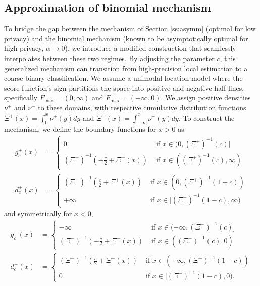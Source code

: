 \documentclass[a4paper, 11pt]{article}
\theoremstyle{definition}
\begin{document}
{\subsection{Approximation of binomial mechanism}{\label{ss:approx}}
To bridge the gap between the mechanism of Section \ref{ss:asymm} (optimal for low privacy) and the binomial mechanism (known to be asymptotically optimal for high privacy, $\alpha \to 0$), we introduce a modified construction that seamlessly interpolates between these two regimes. By adjusting the parameter $c$, this generalized mechanism can transition from high-precision local estimation to a coarse binary classification. We assume a unimodal location model where the score function's sign partitions the space into positive and negative half-lines, specifically $F^+_{\text{max}}=(0,\infty)$ and $F^{\prime +}_{\text{max}}=(-\infty,0)$. We assign positive densities $\nu^+$ and $\nu^-$ to these domains, with respective cumulative distribution functions $\Xi^+(x)=\int_0^x \nu^+(y)dy$ and $\Xi^-(x)=\int_{-\infty}^x \nu^-(y)dy$. To construct the mechanism, we define the boundary functions for $x>0$ as
\begin{align*}
	g^+_c(x)&=
	\begin{cases}
		0 & \text{ if $x \in (0, (\Xi^+)^{-1}(c) ]$}
			\\
		(\Xi^+)^{-1}(-\frac{c}{2}+\Xi^+(x)) & \text{ if $x \in ( (\Xi^+)^{-1}(c), \infty)$}
	\end{cases}
	\\
	d^+_c(x)&=
	\begin{cases}
		(\Xi^+)^{-1}(\frac{c}{2}+\Xi^+(x)) & \text{ if $x \in (0 , (\Xi^+)^{-1}(1-c))$}
		\\
		+\infty & \text{ if $x \in [ (\Xi^+)^{-1}(1-c), \infty)$}
	\end{cases}
\end{align*}
and symmetrically for $x<0$,
\begin{align*}
	g^-_c(x)&=
	\begin{cases}
		-\infty  & \text{ if $x \in (-\infty, (\Xi^-)^{-1}(c) ]$}
		\\
		(\Xi^-)^{-1}(-\frac{c}{2}+\Xi^-(x)) & \text{ if $x \in ( (\Xi^-)^{-1}(c),0)$}
	\end{cases}
	\\
	d^-_c(x)&=
	\begin{cases}
		(\Xi^-)^{-1}(\frac{c}{2}+\Xi^-(x)) & \text{ if $x \in (-\infty , (\Xi^-)^{-1}(1-c))$}
		\\
		0 & \text{ if $x \in [ (\Xi^-)^{-1}(1-c), 0)$.}
	\end{cases}

\end{align*}}
\end{document}
